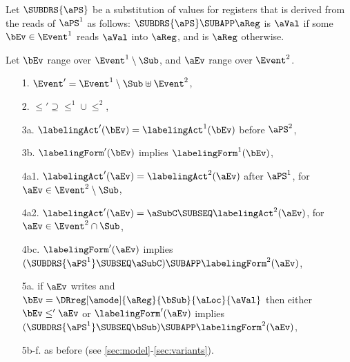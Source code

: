 \begin{definition}
Let $\SUBDRS{\aPS}$ be a substitution of values for registers that is derived
from the reads of $\aPS^1$ as follows: $\SUBDRS{\aPS}\SUBAPP\aReg$ is $\aVal$
if some $\bEv\in\Event^1$ reads $\aVal$ into $\aReg$, and is $\aReg$ otherwise.

Let $\bEv$ range over $\Event^1\setminus\Sub$, and $\aEv$ range over $\Event^2$.  


\begin{enumerate}
\item[1.] $\Event' = \Event^1\setminus\Sub \uplus \Event^2$,
\item[2.] ${\le'}\supseteq{\le^1}\cup{\le^2}$, 
\item[3a.] $\labelingAct'(\bEv) = \labelingAct^1(\bEv)$ before $\aPS^2$,
\item[3b.] $\labelingForm'(\bEv)$ implies $\labelingForm^1(\bEv)$,
\item[4a1.] $\labelingAct'(\aEv) = \labelingAct^2(\aEv)$  after $\aPS^1$,  for $\aEv\in\Event^2\setminus\Sub$,
\item[4a2.] $\labelingAct'(\aEv) = \aSubC\SUBSEQ\labelingAct^2(\aEv)$,  for $\aEv\in\Event^2\cap\Sub$, 
\item[4bc.] $\labelingForm'(\aEv)$ implies
  $(\SUBDRS{\aPS^1} \SUBSEQ \aSubC)\SUBAPP\labelingForm^2(\aEv)$, 
\item[5a.] if $\aEv$ writes and
  $\bEv=\DRreg[\amode]{\aReg}{\bSub}{\aLoc}{\aVal}$
  then either $\bEv\le'\aEv$ or
  $\labelingForm'(\aEv)$ implies  
  $(\SUBDRS{\aPS^1}\SUBSEQ \bSub)\SUBAPP\labelingForm^2(\aEv)$,
\item[5b-f.] as before (see \textsection\ref{sec:model}-\ref{sec:variants}). %

\end{enumerate}
\end{definition}

